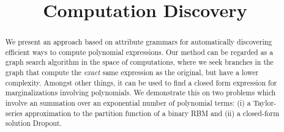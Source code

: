 \documentclass{article} %
\title{Computation Discovery}
\begin{document}
\maketitle

\begin{abstract} We present an approach based on attribute grammars
  for automatically discovering efficient ways to compute polynomial
  expressions. Our method can be regarded as
  a graph search algorithm in the space of computations, where we seek
  branches in the graph that compute the {\em exact} same expression as
  the original, but have a lower complexity. Amongst other things, it can be used
  to find a closed form expression for marginalizations involving
  polynomials. We demonstrate this on two problems which involve an
  summation over an exponential number of polynomial terms: (i) a
  Taylor-series approximation to the partition function of a binary
  RBM and (ii) a closed-form solution Dropout. 
 \end{abstract} 










\nocite{*}


\end{document}
